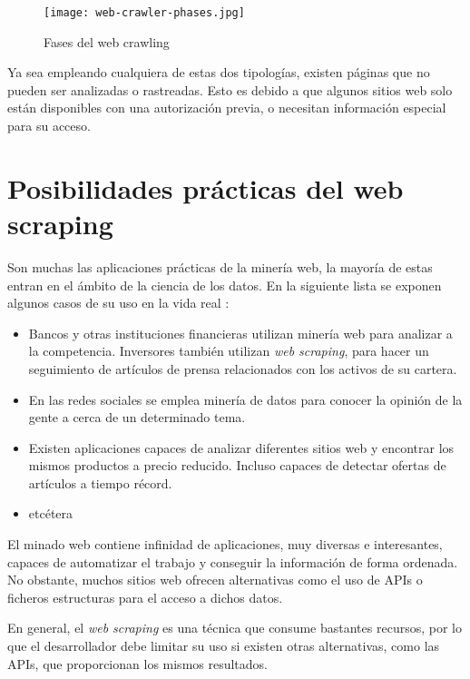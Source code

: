 \begin{figure}[tphb]
\centering
\texttt{[image: web-crawler-phases.jpg]}
\caption{Fases del web crawling}
\label{img:web-crawler-phases}
\end{figure}

Ya sea empleando cualquiera de estas dos tipologías, existen páginas que no pueden ser analizadas o
rastreadas. Esto es debido a que algunos sitios web solo están disponibles con una autorización previa, o
necesitan información especial para su acceso.

\section{Posibilidades prácticas del web scraping}
\label{sec:posibilidades practicas del web scraping}

Son muchas las aplicaciones prácticas de la minería web, la mayoría de estas entran en el ámbito de la
ciencia de los datos. En la siguiente lista se exponen algunos casos de su uso en la vida real
\cite{web-scraping-seppe}:

\begin{itemize}
    \item Bancos y otras instituciones financieras utilizan minería web para analizar a la competencia.
    Inversores también utilizan \emph{web scraping}, para hacer un seguimiento de artículos de prensa 
    relacionados con los activos de su cartera.

    \item En las redes sociales se emplea minería de datos para conocer la opinión de la gente a cerca de 
    un determinado tema.

    \item Existen aplicaciones capaces de analizar diferentes sitios web y encontrar los mismos productos 
    a precio reducido. Incluso capaces de detectar ofertas de artículos a tiempo récord.

    \item etcétera
\end{itemize}

El minado web contiene infinidad de aplicaciones, muy diversas e interesantes, capaces de automatizar el
trabajo y conseguir la información de forma ordenada. No obstante, muchos sitios web ofrecen alternativas
como el uso de APIs o ficheros estructuras para el acceso a dichos datos.

En general, el \emph{web scraping} es una técnica que consume bastantes recursos, por lo que el desarrollador
debe limitar su uso si existen otras alternativas, como las APIs, que proporcionan los mismos resultados.

